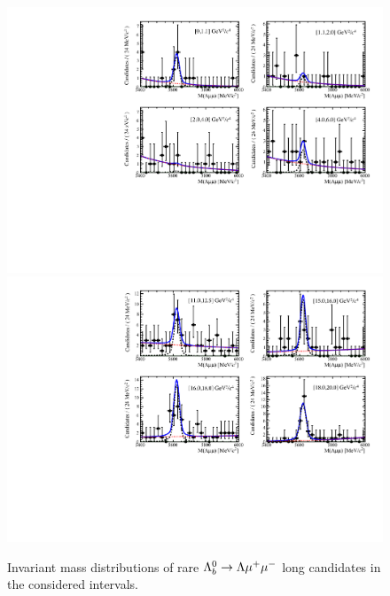 \begin{figure}
\centering
\includegraphics[width=1.\textwidth]{Lmumu/figs/MassFits/q2_fits_LL_plot2.pdf}
\includegraphics[width=1.\textwidth]{Lmumu/figs/MassFits/q2_fits_LL_plot1.pdf}
\caption{Invariant mass distributions of rare $\Lambda^0_b\rightarrow\Lambda\mu^+\mu^-$ long candidates in the considered \qsq intervals.
 }
\label{fig:Lb_differentialFitLL}
\end{figure}




